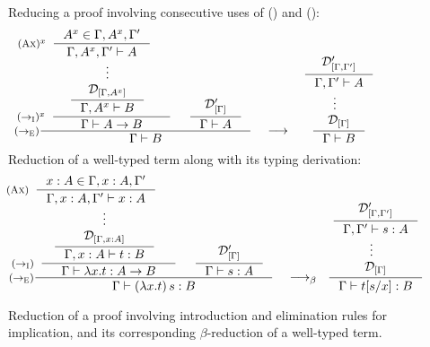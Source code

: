 \begin{figure}
Reducing a proof involving consecutive uses of
() and ():
\[
\inference[($->_\textsc{E}$)]
        {\hspace*{-3em}
         \inference[$(->_\textsc{I})^{x}$]
                {\hspace*{-1em}
                 \inference*
                        {\hspace*{-4em}
                         \inference[$(\textsc{Ax})^{x}$]
                                {A^x\in\Gamma,A^x,\Gamma'}
                                {\Gamma,A^x,\Gamma' |- A} \\
                         \vdots \\
                         \mathcal{D}_{[\Gamma,A^x]} }
                        {\Gamma,A^x |- B} }
                {\Gamma |- A -> B}
        &\inference*{\mathcal{D}'_{[\Gamma]}}{\Gamma |- A} }
        {\Gamma |- B}
\quad
\longrightarrow
~
\inference*{
        \inference*{\mathcal{D}'_{[\Gamma,\Gamma']}}{\Gamma,\Gamma' |- A} \\
        \vdots_{\phantom{G}} \\
        \mathcal{D}_{[\Gamma]} }{\Gamma |- B}
\]
Reduction of a well-typed term along with its typing derivation:
\[
\inference[($->_\textsc{E}$)]
        {\hspace*{-3em}
         \inference[$(->_\textsc{I})$]
                {\hspace*{-1em}
                 \inference*
                        {\hspace*{-4em}
                         \inference[$(\textsc{Ax})$]
                                {x:A\in\Gamma,x:A,\Gamma'}
                                {\Gamma,x:A,\Gamma' |- x:A} \\
                         \vdots \\
                         \mathcal{D}_{[\Gamma,x:A]} }
                        {\Gamma,x:A |- t:B} }
                {\Gamma |- \l x.t : A -> B}
        &\inference*{\mathcal{D}'_{[\Gamma]}}{\Gamma |- s:A} }
        {\Gamma |- (\l x.t)\,s:B}
\quad
\longrightarrow_\beta
~
\inference*{
        \inference*{\mathcal{D}'_{[\Gamma,\Gamma']}}{\Gamma,\Gamma' |- s:A} \\
        \vdots_{\phantom{G}} \\
        \mathcal{D}_{[\Gamma]} }{\Gamma |- t[s/x]:B}
\]
\caption{Reduction of a proof involving introduction and elimination rules
        for implication, and its corresponding $\beta$-reduction 
        of a well-typed term.}
\label{fig:proofreduce}
\end{figure}

